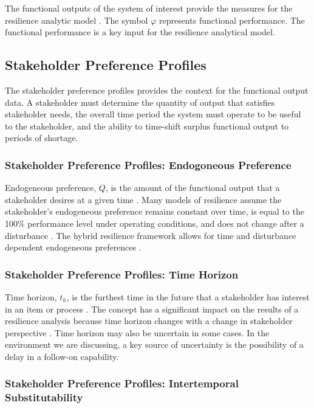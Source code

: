 \documentclass[preprint,12pt]{elsarticle}
\begin{document}
The functional outputs of the system of interest provide the
measures for the resilience analytic model \cite{Ayyub2014}. The
symbol $\varphi$ represents functional performance. The functional
performance is a key input for the resilience analytical model.

\subsection{Stakeholder Preference Profiles}
The stakeholder preference profiles provides the context for the
functional output data. A stakeholder must determine the quantity of
output that satisfies stakeholder needs, the overall time period the
system must operate to be useful to the stakeholder, and the ability
to time-shift surplus functional output to periods of shortage.

\subsubsection{Stakeholder Preference Profiles: Endogoneous Preference}

Endogeneous preference, $Q$, is the amount of the functional output
that a stakeholder desires at a given time \cite{Black2013}.  Many
models of resilience assume the stakeholder's endogeneous preference
remains constant over time, is equal to the 100\% 
performance level under operating conditions, and does not change
after a disturbance \cite{Emanuel2017}. The hybrid resilience
framework allows for time and disturbance dependent endogeneous
preferences \cite{Emanuel2018}.

\subsubsection{Stakeholder Preference Profiles: Time Horizon}
Time horizon, $t_h$, is the furthest time in the future that a stakeholder 
has interest in an item or process \cite{Black2013}. The concept has a
significant impact on the results 
of a resilience analysis because time 
horizon changes with a change in stakeholder perspective
\cite{Emanuel2018}. Time horizon may also be uncertain in
some cases. In the environment we are discussing, a key source of
uncertainty is the possibility of a delay in a follow-on capability.

\subsubsection{Stakeholder Preference Profiles: Intertemporal
  Substitutability}
\end{document}
